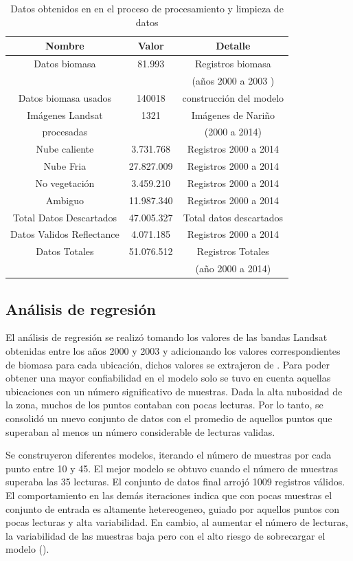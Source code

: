 \begin{table}
\caption{Datos obtenidos en en el proceso de procesamiento y limpieza  de datos}
\label{tab:datos}
\centering
\begin{tabular}{c c c}
\toprule
 Nombre & Valor& Detalle  \\
\midrule
Datos biomasa & 81.993 & Registros biomasa \\
 & & (años 2000 a 2003 \cite{baccini2008afirst})\\
Datos biomasa usados & 140018 & construcción del modelo\\
\hline
Imágenes Landsat& 1321 & Imágenes de Nariño\\
procesadas & & (2000 a 2014) \\
Nube caliente & 3.731.768 & Registros 2000 a 2014 \\
Nube Fria & 27.827.009 & Registros 2000 a 2014 \\
No vegetación & 3.459.210 & Registros 2000 a 2014 \\
Ambiguo & 11.987.340 & Registros 2000 a 2014 \\
\hline
Total Datos Descartados & 47.005.327 & Total datos descartados \\
Datos Validos Reflectance & 4.071.185 & Registros 2000 a 2014 \\
\hline
Datos Totales & 51.076.512 & Registros Totales\\
& & (año 2000 a 2014) \\
\bottomrule
\end{tabular}
\end{table}

\subsection{Análisis de regresión}

El análisis de regresión se realizó tomando los valores de las bandas Landsat obtenidas entre los años 2000 y 2003 y adicionando los valores correspondientes de biomasa para cada ubicación, dichos valores  se extrajeron de \cite{baccini2008afirst}.  Para poder obtener una mayor confiabilidad en el modelo solo se tuvo en cuenta aquellas ubicaciones con un número significativo de muestras.  Dada la alta nubosidad de la zona, muchos de los puntos contaban con pocas lecturas.  Por lo tanto, se consolidó un nuevo conjunto de datos con el promedio de aquellos puntos que superaban al menos un número considerable de lecturas validas.  

Se construyeron diferentes modelos, iterando el número de muestras por cada punto entre 10 y 45.  El mejor modelo se obtuvo cuando el número de muestras superaba las 35 lecturas.  El conjunto de datos final arrojó 1009 registros válidos.  El comportamiento en las demás iteraciones indica que con pocas muestras el conjunto de entrada es altamente hetereogeneo, guiado por aquellos puntos con pocas lecturas y alta variabilidad.  En cambio, al aumentar el número de lecturas, la variabilidad de las muestras baja pero con el alto riesgo de sobrecargar el modelo (\cite{babyak_what_2004}). 

